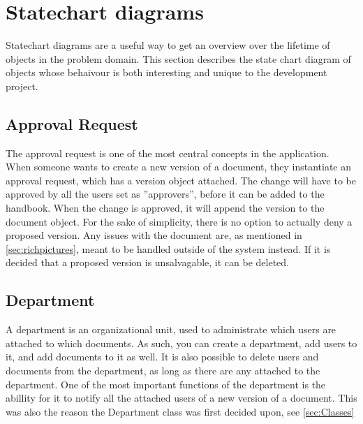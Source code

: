 \section{Statechart diagrams} \label{sec:statechart}
Statechart diagrams are a useful way to get an overview over the lifetime of objects in the problem domain.
This section describes the state chart diagram of objects whose behaivour is both interesting and unique to the development project.

\subsection{Approval Request}
The approval request is one of the most central concepts in the application.
When someone wants to create a new version of a document, they instantiate an approval request, which has a version object attached.
The change will have to be approved by all the users set as ''approvers'', before it can be added to the handbook.
When the change is approved, it will append the version to the document object.
For the sake of simplicity, there is no option to actually deny a proposed version.
Any issues with the document are, as mentioned in \cref{sec:richpictures}, meant to be handled outside of the system instead. If it is decided that a proposed version is unsalvagable, it can be deleted.

\begin{figure}[H]
	\centering
{}
\end{figure}

\subsection{Department}
A department is an organizational unit, used to administrate which users are attached to which documents.
As such, you can create a department, add users to it, and add documents to it as well.
It is also possible to delete users and documents from the department, as long as there are any attached to the department.
One of the most important functions of the department is the abillity for it to notify all the attached users of a new version of a document.
This was also the reason the Department class was first decided upon, see \cref{sec:Classes}

